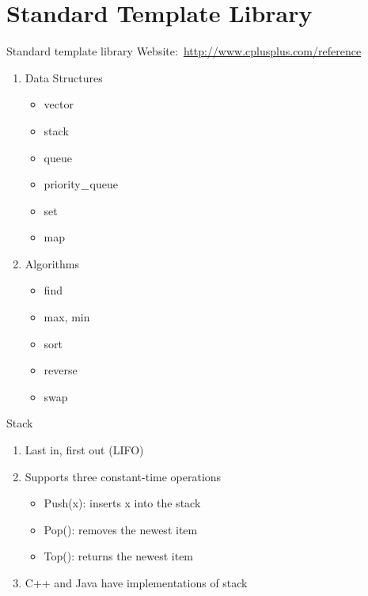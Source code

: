 \documentclass{beamer}
\begin{document}
\section{Standard Template Library}
\newcommand\UND{\mathbin{\char`\_}}
\begin{frame}[<+->]{Standard template library}
\alert{Website$:$ \url{http://www.cplusplus.com/reference}}
\begin{enumerate}
\item Data Structures
\begin{itemize}
\item vector
\item stack
\item queue 
\item priority$\UND$queue
\item set
\item map
\end{itemize}
\item Algorithms 
\begin{itemize}
\item find
\item max, min
\item sort
\item reverse
\item swap
\end{itemize}
\end{enumerate}
\end{frame}

\begin{frame}[<+->]{Stack}
\begin{enumerate}
  \item Last in, first out (LIFO)
  \item Supports three constant-time operations\\
  \begin{itemize}
    \item Push(x): inserts x into the stack
    \item Pop(): removes the newest item
    \item Top(): returns the newest item
  \end{itemize}
  \item C++ and Java have implementations of stack
\end{enumerate}
\end{frame}
\end{document}
